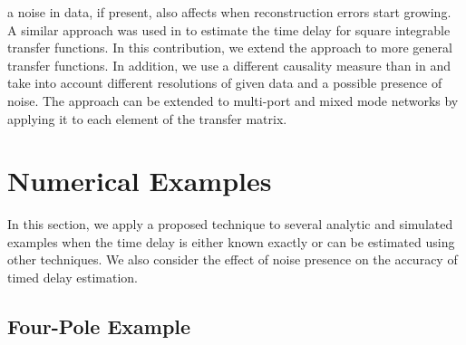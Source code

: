 \documentclass[journal,twoside]{IEEEtran}
\begin{document}
a noise in data, if present, also affects when reconstruction errors start growing. 
A similar approach was used in \cite{Knockaert_Dhaene_2008} to estimate the time delay for square integrable transfer functions. In this contribution, we extend the approach to more general transfer functions. In addition, we use a different causality measure than in \cite{Knockaert_Dhaene_2008} and take into account different resolutions of given data and a possible presence of noise.
The approach can be extended to multi-port and mixed mode networks by applying it to each element of the transfer matrix.

\section{Numerical Examples} \label{numerical_examples}

In this section, we apply a proposed technique to several analytic and simulated examples when the time delay is either known exactly or can be estimated using other techniques. We also consider the effect of noise presence on the accuracy of timed delay estimation.

\subsection{Four-Pole Example} \label{Example_four_pole}
\end{document}
